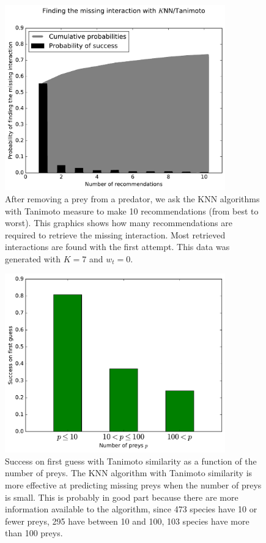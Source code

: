 \documentclass[letterpaper]{article}
\begin{document}
\begin{figure}
  \centering\includegraphics[width=0.85\textwidth]{Figures/tanimoto.pdf}

  \caption{After removing a prey from a predator, we ask the KNN algorithms
  with Tanimoto measure to make 10 recommendations (from best to worst). This
  graphics shows how many recommendations are required to retrieve the missing
  interaction. Most retrieved interactions are found with the first attempt.
  This data was generated with $K = 7$ and $w_t = 0$.}

  \label{fig:tanimoto}
\end{figure}

\begin{figure}
  \centering\includegraphics[width=0.85\textwidth]{Figures/tanimoto_n_preys.pdf}

  \caption{Success on first guess with Tanimoto similarity as a function of the
  number of preys. The KNN algorithm with Tanimoto similarity is more effective
  at predicting missing preys when the number of preys is small. This is
  probably in good part because there are more information available to the
  algorithm, since 473 species have 10 or fewer preys, 295 have between 10 and
  100, 103 species have more than 100 preys.}

  \label{fig:tanimoto_n_preys}
\end{figure}
\end{document}
